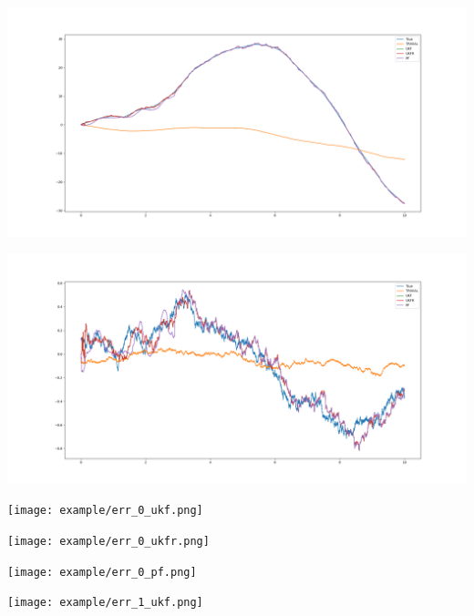 \documentclass[12pt]{article}
\begin{document}
\begin{landscape}
	\includegraphics[width=1.0\linewidth]{example/estimate_2.png}\newpage
\end{landscape}

\begin{landscape}
	\includegraphics[width=1.0\linewidth]{example/estimate_3.png}\newpage
\end{landscape}

\newpage

\begin{landscape}
	\texttt{[image: example/err\_0\_ukf.png]}\newpage
\end{landscape}

\begin{landscape}
	\texttt{[image: example/err\_0\_ukfr.png]}\newpage
\end{landscape}

\begin{landscape}
	\texttt{[image: example/err\_0\_pf.png]}\newpage
\end{landscape}

\begin{landscape}
	\texttt{[image: example/err\_1\_ukf.png]}\newpage
\end{landscape}
\end{document}
